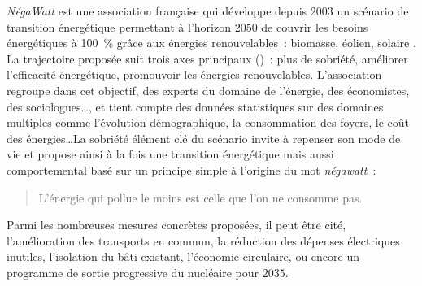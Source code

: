\textit{NégaWatt} est une association française qui développe depuis $2003$ un scénario de
transition énergétique permettant à l’horizon $2050$ de couvrir les besoins énergétiques à
\SI{100}{\percent} grâce aux énergies renouvelables~: biomasse, éolien, solaire \parencite{negaWatt2017}. La
trajectoire proposée suit trois axes principaux ()~: plus de
sobriété, améliorer l’efficacité énergétique, promouvoir les énergies renouvelables.
L’association regroupe dans cet objectif, des experts du domaine de l’énergie, des
économistes, des sociologues\dots, et tient compte des données statistiques sur des
domaines multiples comme l’évolution démographique, la consommation des foyers, le coût
des énergies\dots La sobriété élément clé du scénario invite à repenser son mode de vie et
propose ainsi à la fois une transition énergétique mais aussi comportemental basé sur un
principe simple à l’origine du mot \textit{négawatt}~:
\blockquote{L’énergie qui pollue le moins est celle que l’on ne consomme pas.}
Parmi les nombreuses mesures concrètes proposées, il peut être cité, l’amélioration des transports en
commun, la réduction des dépenses électriques inutiles, l’isolation du bâti existant,
l’économie circulaire, ou encore un programme de sortie progressive du nucléaire pour
$2035$.



